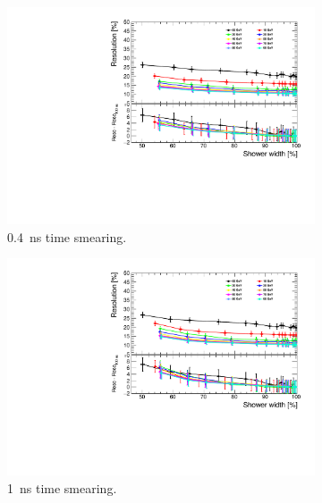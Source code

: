 \begin{figure}[htbp!]
  \centering
  \begin{subfigure}[t]{0.48\textwidth}
    \centering
    \includegraphics[width=1\linewidth]{../Thesis_Plots/ILD/Smearing_0.4ns/Plots/ShowerWidth_Resolution_Smearing1}
    \caption{\SI{0.4}{\nano\second} time smearing.} \label{fig:WidthReso0.4ns}
  \end{subfigure}
  \begin{subfigure}[t]{0.48\textwidth}
    \centering
    \includegraphics[width=1\linewidth]{../Thesis_Plots/ILD/Smearing_1ns/Plots/ShowerWidth_Resolution_Smearing2}
    \caption{\SI{1}{\nano\second} time smearing.} \label{fig:WidthReso1ns}
  \end{subfigure}
  \begin{subfigure}[t]{0.48\textwidth}

\end{subfigure}
\end{figure}
